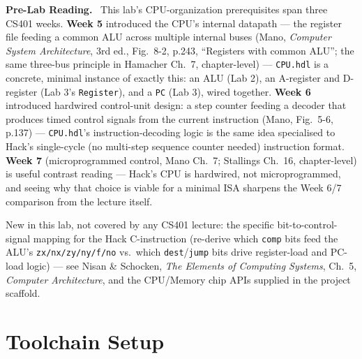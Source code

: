 \documentclass[11pt]{article}
\newenvironment{tocitebox}{%
  \par\noindent\textbf{\textcolor{primary-gold}{Pre-Lab Reading.}}\
}{\par\vspace{0.3em}}
\begin{document}
\begin{tocitebox}
This lab's CPU-organization prerequisites span three CS401 weeks. \textbf{Week 5} introduced the CPU's internal datapath --- the register file feeding a common ALU across multiple internal buses (Mano, \emph{Computer System Architecture}, 3rd ed., Fig.~8-2, p.243, ``Registers with common ALU''; the same three-bus principle in Hamacher Ch.~7, chapter-level) --- \texttt{CPU.hdl} is a concrete, minimal instance of exactly this: an ALU (Lab 2), an A-register and D-register (Lab 3's \texttt{Register}), and a \texttt{PC} (Lab 3), wired together. \textbf{Week 6} introduced hardwired control-unit design: a step counter feeding a decoder that produces timed control signals from the current instruction (Mano, Fig.~5-6, p.137) --- \texttt{CPU.hdl}'s instruction-decoding logic is the same idea specialised to Hack's single-cycle (no multi-step sequence counter needed) instruction format. \textbf{Week 7} (microprogrammed control, Mano Ch.~7; Stallings Ch.~16, chapter-level) is useful contrast reading --- Hack's CPU is hardwired, not microprogrammed, and seeing why that choice is viable for a minimal ISA sharpens the Week 6/7 comparison from the lecture itself.

\smallskip
\noindent New in this lab, not covered by any CS401 lecture: the specific bit-to-control-signal mapping for the Hack C-instruction (re-derive which \texttt{comp} bits feed the ALU's \texttt{zx/nx/zy/ny/f/no} vs.\ which \texttt{dest}/\texttt{jump} bits drive register-load and PC-load logic) --- see Nisan \& Schocken, \emph{The Elements of Computing Systems}, Ch.~5, \emph{Computer Architecture}, and the CPU/Memory chip APIs supplied in the project scaffold.
\end{tocitebox}

\section{Toolchain Setup}
\end{document}
